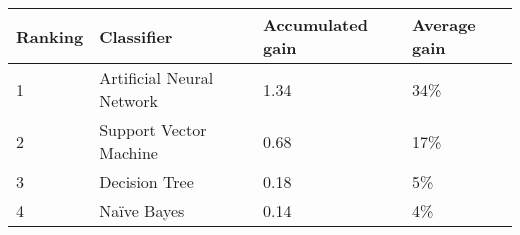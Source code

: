 \begin{tabular}{|l|l|l|l|}
\hline
Ranking  & Classifier                & Accumulated gain  & Average gain\\
\hline
1        & Artificial Neural Network & 1.34   & 34\%        \\
2        & Support Vector Machine    & 0.68  & 17\%       \\
3        & Decision Tree             & 0.18   & 5\%         \\
4        & Naïve Bayes               & 0.14   & 4\%         \\
\hline
\end{tabular}
